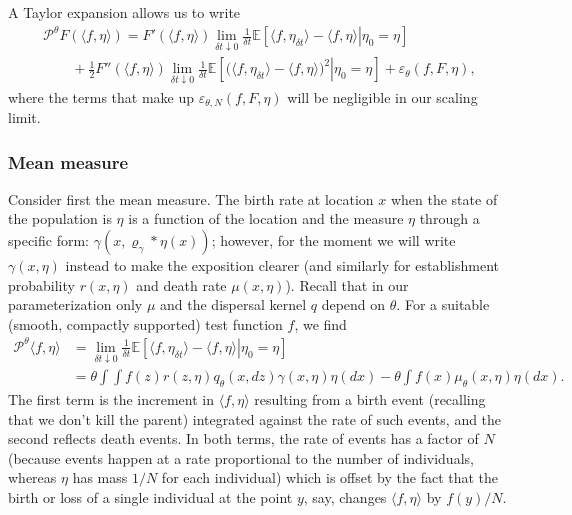 \documentclass[12pt]{article}
\newcommand{\IE}{\mathbb E}
\newcommand{\kernel}{\varrho}  %
\newcommand{\smooth}[1]{\kernel_{#1} \! * \!}  %
\newcommand{\Pgen}{\mathcal{P}}    %
\begin{document}
A Taylor expansion allows us to write
\begin{multline*}
    \Pgen^\theta
    F(\langle f,\eta \rangle)
    =
    F'(\langle f, \eta \rangle)
    \lim_{\delta t\downarrow 0} \frac{1}{\delta t}
    \IE\left[
        \left. \langle f, \eta_{\delta t} \rangle
        -
        \langle f, \eta \rangle
        \right| \eta_0=\eta
    \right]
    \\
    \qquad {}
    + \frac{1}{2}
        F''(\langle f,\eta\rangle)
    \lim_{\delta t\downarrow 0}\frac{1}{\delta t}
    \IE\left[
        \left.\big(\langle f,\eta_{\delta t}\rangle
        -
        \langle f, \eta\rangle\big)^2 \right|\eta_0=\eta
    \right]
    +
    \varepsilon_{\theta}(f, F, \eta),
\end{multline*}
where the terms that make up 
$\varepsilon_{\theta, N}(f, F, \eta)$
will be negligible in our scaling limit. 

\subsubsection*{Mean measure}

Consider first the mean measure.
The birth rate at location $x$ when the state of the population is $\eta$
is a function of the location and the measure $\eta$ through a specific form:
$\gamma(x, \smooth{\gamma} \eta(x))$;
however, for the moment we will write $\gamma(x, \eta)$ instead
to make the exposition clearer
(and similarly for establishment probability $r(x, \eta)$ and death rate $\mu(x, \eta)$).
Recall that in our parameterization only $\mu$ and the dispersal kernel $q$ depend on $\theta$.
For a suitable (smooth, compactly supported) test function $f$, we find
\begin{equation} \label{mean measure}
    \begin{split}
    \Pgen^\theta \langle f, \eta \rangle
    &=
    \lim_{\delta t\downarrow 0} \frac{1}{\delta t}
    \IE\left[ \left.
        \langle f, \eta_{\delta t} \rangle
        -
        \langle f, \eta\rangle
        \right| \eta_0 = \eta
    \right]
    \\
    &=
    \theta \int
        \int f(z) r(z,\eta) q_\theta(x,dz)
    \gamma(x, \eta) \eta(dx)
    -
    \theta \int f(x)\mu_\theta(x, \eta)
    \eta(dx).
    \end{split}
\end{equation}
The first term is the increment in $\langle f,\eta\rangle$
resulting from a birth event (recalling that
we don't kill the parent) integrated against the rate of such events,
and the second reflects death events.
In both terms,
the rate of events has a factor of $N$ (because events happen at a rate 
proportional to the number of individuals,
whereas $\eta$ has mass $1/N$ for each individual)
which is offset by the fact that  
the birth or loss of a single 
individual at the point $y$, say, changes $\langle f,\eta\rangle$
by $f(y)/N$.
\end{document}
